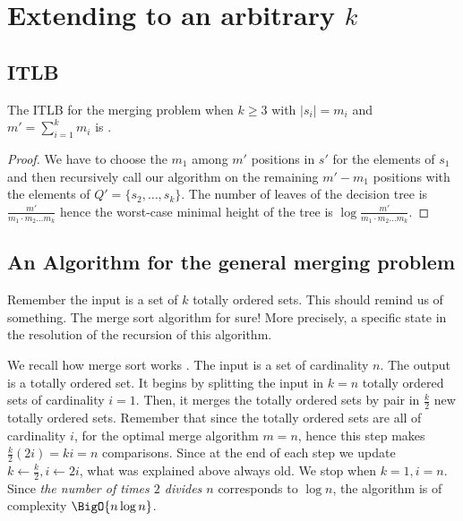 \section{Extending to an arbitrary $k$}
\label{tree:merging:kgeq3}


\subsection{ITLB}
\label{tree:merging:kgeq3:ITLB}


\begin{theorem}
The ITLB for the merging problem when $k \geq 3$ with $|s_i| = m_i$ and $m' = \sum_{i=1}^{k} m_i$ is .
\end{theorem}

\begin{proof}
We have to choose the $m_1$ among $m'$ positions in $s'$ for the elements of $s_1$ and then recursively call our algorithm on the remaining $m'-m_1$ positions with the elements of $Q' = \{s_2, \dots, s_k\}$. The number of leaves of the decision tree is $\frac{m'}{m_1 \cdot m_2 \dots m_k}$ hence the worst-case minimal height of the tree is $\log \frac{m'}{m_1 \cdot m_2 \dots m_k}$.
\end{proof}


\subsection{An Algorithm for the general merging problem}
\label{tree:merging:kgeq3:alg}

Remember the input is a set of $k$ totally ordered sets. This should remind us of something. The merge sort algorithm for sure! More precisely, a specific state in the resolution of the recursion of this algorithm.

We recall how merge sort works \cite{leiserson2001introduction}. The input is a set of cardinality $n$. The output is a totally ordered set. It begins by splitting the input in $k = n$ totally ordered sets of cardinality $i = 1$. Then, it merges the totally ordered sets by pair in $\frac{k}{2}$ new totally ordered sets. Remember that since the totally ordered sets are all of cardinality $i$, for the optimal merge algorithm $m=n$, hence this step makes $\frac{k}{2} (2 i) = k i = n$ comparisons. Since at the end of each step we update $k \gets \frac{k}{2}, i \gets 2i$, what was explained above always old. We stop when $k = 1, i = n$.
Since \emph{the number of times $2$ divides $n$} corresponds to $\log n$, the algorithm is of complexity $\BigO{n \log n}$.

